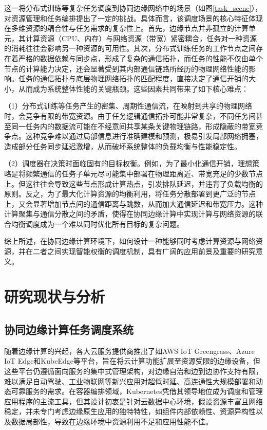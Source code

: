 这一将分布式训练等复杂任务调度到协同边缘网络中的场景（如图\ref{task_scene}），对资源管理和任务编排提出了一定的挑战。具体而言，该调度场景的核心特征体现在多维资源的耦合性与任务需求的复杂性上\cite{ENTS}。首先，边缘节点并非孤立的计算单元，其计算资源（CPU、内存）与网络资源（带宽）紧密耦合，任务对一种资源的消耗往往会影响另一种资源的可用性。其次，分布式训练任务的工作节点之间存在着严格的数据依赖与同步点，形成了复杂的通信拓扑，而任务的性能不仅由单个节点的计算能力决定，还会显著受到其内部通信链路所经历的物理网络性能的影响。任务的通信拓扑与底层物理网络拓扑的匹配程度，直接决定了通信开销的大小，从而成为系统整体性能的关键瓶颈。这些因素共同带来了如下核心难点：

（1）分布式训练等任务产生的密集、周期性通信流，在映射到共享的物理网络时，会竞争有限的带宽资源。由于任务逻辑通信拓扑可能非常复杂，不同任务间甚至同一任务内的数据流可能在不经意间共享某条关键物理链路，形成隐蔽的带宽竞争点\cite{kairouz2021advancesopenproblemsfederated}。这种竞争难以通过局部信息进行准确建模和预测，极易引发局部网络拥塞，造成部分任务同步延迟激增，从而破坏系统整体的负载均衡与性能稳定性。

（2）调度器在决策时面临固有的目标权衡。例如，为了最小化通信开销，理想策略是将频繁通信的任务子单元尽可能集中部署在物理距离近、带宽充足的少数节点上。但这往往会导致这些节点形成计算热点，引发排队延迟，并违背了负载均衡的原则。反之，为了最大化计算资源的均衡利用，将任务分散部署到更广泛的节点上，又会显著增加节点间的通信距离与跳数，从而加大通信延迟和带宽压力。这种计算聚集与通信分散之间的矛盾，使得在协同边缘计算中实现计算与网络资源的联合均衡调度成为一个难以同时优化所有目标的复杂问题。

综上所述，在协同边缘计算环境下，如何设计一种能够同时考虑计算资源与网络资源，并在二者之间实现智能权衡的调度机制，具有广阔的应用前景及重要的研究意义。

\section{研究现状与分析}
\subsection{协同边缘计算任务调度系统}
随着边缘计算的兴起，各大云服务提供商推出了如AWS IoT Greengrass\cite{kurniawan2018learning}、Azure IoT Edge\cite{jensen2019beginning}和KubeEdge\cite{8567693}等平台，旨在将云计算功能扩展至资源受限的边缘设备，但这些平台仍遵循面向服务的集中式管理架构，对边缘自治和边到边协作支持有限，难以满足自动驾驶、工业物联网等新兴应用对超低时延、高连通性大规模部署和动态可靠服务的需求。在容器编排领域，Kubernetes凭借其领导地位成为调度和管理应用程序的主流工具，但其设计初衷是针对云数据中心环境，假设资源丰富且网络稳定，并未专门考虑边缘原生应用的独特特性，如组件内部依赖性、资源异构性以及数据局部性，导致在边缘环境中资源利用不足和应用性能不佳。

